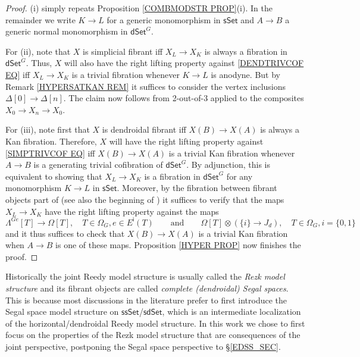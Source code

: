 \documentclass[a4paper,10pt
,draft
]{article}%
\begin{document}
\begin{proof}
(i) simply repeats Proposition \ref{COMBMODSTR PROP}(i). In the remainder we write $K \to L$ for a generic monomorphism in 
$\mathsf{sSet}$
and $A \to B$ a generic normal monomorphism in $\mathsf{dSet}^G$.

For (ii), note that $X$ is simplicial fibrant iff 
$X_L \to X_K$ is always a fibration in $\mathsf{dSet}^G$. 
Thus, $X$ will also have the right lifting property against  \eqref{DENDTRIVCOF EQ} iff 
$X_L \to X_K$ is a trivial fibration whenever $K \to L$ is anodyne. But by Remark \ref{HYPERSATKAN REM}
it suffices to consider the vertex inclusions $\Delta[0] \to \Delta[n]$.
The claim now follows from 2-out-of-3 applied to the composites $X_0 \to X_n \to X_0$.

For (iii), note first that $X$ is dendroidal fibrant iff $X(B) \to X(A)$ is always a Kan fibration.
Therefore, $X$ will have the right lifting property against \eqref{SIMPTRIVCOF EQ} iff 
$X(B) \to X(A)$ is a trivial Kan fibration whenever $A\to B$ is a generating trivial cofibration of $\mathsf{dSet}^G$.
By adjunction, this is equivalent to showing that
$X_L \to X_K$ is a fibration in $\mathsf{dSet}^G$ for any monomorphism $K \to L$ in $\mathsf{sSet}$. Moreover, by the fibration between fibrant objects part of \cite[Prop. 8.8]{Per17}
(see also the beginning of \cite[\S 8.1]{Per17})
it suffices to verify that the maps $X_L \to X_K$ have the right lifting property against the maps
\[
	\Lambda^{G e} [T] \to \Omega[T],
	\quad
	T \in \Omega_G, e \in E^{\mathsf{i}}(T)
\qquad
\text{and}
\qquad
	\Omega[T] \otimes \left( \{i\} \to J_d\right),
	\quad
	T \in \Omega_G, i = \{0,1\}
\]
and it thus suffices to check that $X(B) \to X(A)$ is a trivial Kan fibration when $A\to B$ is one of these maps.
Proposition \ref{HYPER PROP} now finishes the proof.
\end{proof}

\begin{remark}
Historically the joint Reedy model structure is usually called the \textit{Rezk model structure} and its fibrant objects are called 
\textit{complete (dendroidal) Segal spaces}.
This is because most discussions in the literature prefer
to first introduce the Segal space model structure on
$\mathsf{ssSet}$/$\mathsf{sdSet}$, which is an intermediate localization of the 
horizontal/dendroidal Reedy model structure.
In this work we chose to first focus on the properties of the Rezk model structure that are consequences of the joint perspective, 
postponing the Segal space perspective to \S \ref{EDSS_SEC}.
\end{remark}
\end{document}
